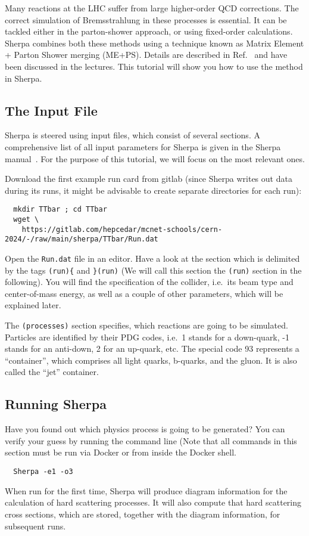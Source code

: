 \documentclass[10pt]{article}
\begin{document}
Many reactions at the LHC suffer from large higher-order QCD corrections.
The correct simulation of Bremsstrahlung in these processes is essential. It can
be tackled either in the parton-shower approach, or using fixed-order calculations.
Sherpa combines both these methods using a technique known as Matrix Element +
Parton Shower merging (ME+PS). Details are described in Ref.~\cite{Buckley:2011ms}
and have been discussed in the lectures. This tutorial will show
you how to use the method in Sherpa.

\subsection{The Input File}

Sherpa is steered using input files, which consist of several sections.
A comprehensive list of all input parameters for Sherpa is given in the
Sherpa manual~\cite{SherpaManual}. For the purpose of this tutorial,
we will focus on the most relevant ones.

Download the first example run card from gitlab (since Sherpa writes out data
during its runs, it might be advisable to create separate directories for each run):
%
\begin{verbatim}
  mkdir TTbar ; cd TTbar
  wget \
    https://gitlab.com/hepcedar/mcnet-schools/cern-2024/-/raw/main/sherpa/TTbar/Run.dat
\end{verbatim}

Open the {\tt Run.dat} file in an editor. Have a look at the section which is
delimited by the tags {\tt(run)\{} and {\tt \}(run)} (We will call this section
the {\tt(run)} section in the following).  You will find the specification of
the collider, i.e.\ its beam type and center-of-mass  energy, as well as a
couple of other parameters, which will be explained later.

The {\tt(processes)} section specifies, which reactions are going to be simulated.
Particles are identified by their PDG codes, i.e.\ 1 stands for a down-quark,
-1 stands for an anti-down, 2 for an up-quark, etc.
The special code 93 represents a ``container'', which comprises all light quarks,
b-quarks, and the gluon. It is also called the ``jet'' container.

\subsection{Running Sherpa}
\label{sec:running_sherpa}

Have you found out which physics process is going to be generated?
You can verify your guess by running the command line (Note that all commands
in this section must be run via Docker or from inside the Docker shell.
\begin{verbatim}
  Sherpa -e1 -o3
\end{verbatim}
When run for the first time, Sherpa will produce diagram information for the calculation
of hard scattering processes. It will also compute that hard scattering cross sections,
which are stored, together with the diagram information, for subsequent runs.
\end{document}
